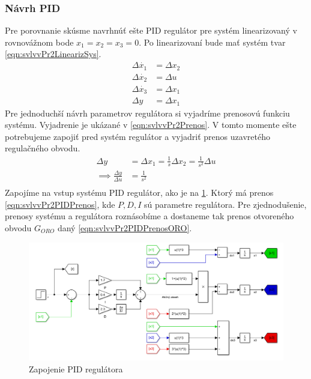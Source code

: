 \documentclass[../main.tex]{subfiles}
\begin{document}
	\subsubsection{Návrh PID}		
	Pre porovnanie skúsme navrhnúť ešte PID regulátor pre systém linearizovaný v rovnovážnom bode $x_1 = x_2 = x_3 = 0$. Po linearizovaní bude mať systém tvar \cref{eqn:svlvvPr2LinearizSys}. 
	\begin{equation}
	\begin{aligned}
	\Delta \dot{x_1}  &= \Delta x_2 \\
	\Delta \dot{x_2} &= \Delta u \\
	\Delta \dot{x_3} &= \Delta x_1 \\
	\Delta y &= \Delta  x_1
	\end{aligned}
	\label{eqn:svlvvPr2LinearizSys}
	\end{equation}	
	Pre jednoduchší návrh parametrov regulátora si vyjadríme prenosovú funkciu systému. Vyjadrenie je ukázané v \cref{eqn:svlvvPr2Prenos}. V tomto momente ešte potrebujeme zapojiť pred systém regulátor a vyjadriť prenos uzavretého regulačného obvodu.
	\begin{equation}
	\begin{aligned}
	\Delta  y &= \Delta x_1 = \frac{1}{s}  \Delta x_2 = \frac{1}{s^2}  \Delta u \\
	\implies \frac{\Delta y}{\Delta u } &= \frac{1}{s^2} \\
	\end{aligned}
	\label{eqn:svlvvPr2Prenos}
	\end{equation}
	Zapojíme na vstup systému PID regulátor, ako je na \cref{fig:svlvvPr2ZapPID}. Ktorý má prenos \cref{eqn:svlvvPr2PIDPrenos}, kde $P, D, I$ sú parametre regulátora. Pre zjednodušenie, prenosy systému a regulátora roznásobíme a dostaneme tak prenos otvoreného obvodu $G_{ORO}$ daný \cref{eqn:svlvvPr2PIDPrenosORO}. 
	\begin{figure}[h!]
		\centering
		\includegraphics[width=0.8\linewidth]{svlvvPr2ZapPID}
		\caption{Zapojenie PID regulátora}
		\label{fig:svlvvPr2ZapPID}
	\end{figure}
\end{document}
